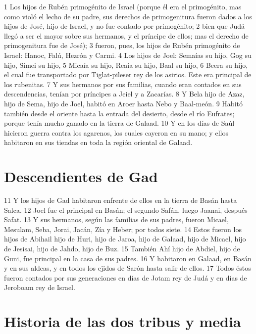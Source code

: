 1 Los hijos de Rubén primogénito de Israel (porque él era el primogénito, mas como violó el lecho de su padre, sus derechos de primogenitura fueron dados a los hijos de José, hijo de Israel, y no fue contado por primogénito;
2 bien que Judá llegó a ser el mayor sobre sus hermanos, y el príncipe de ellos; mas el derecho de primogenitura fue de José);
3 fueron, pues, los hijos de Rubén primogénito de Israel: Hanoc, Falú, Hezrón y Carmi.
4 Los hijos de Joel: Semaías su hijo, Gog su hijo, Simei su hijo,
5 Micaía su hijo, Reaía su hijo, Baal su hijo,
6 Beera su hijo, el cual fue transportado por Tiglat-pileser rey de los asirios. Este era principal de los rubenitas.
7 Y sus hermanos por sus familias, cuando eran contados en sus descendencias, tenían por príncipes a Jeiel y a Zacarías.
8 Y Bela hijo de Azaz, hijo de Sema, hijo de Joel, habitó en Aroer hasta Nebo y Baal-meón.
9 Habitó también desde el oriente hasta la entrada del desierto, desde el río Eufrates; porque tenía mucho ganado en la tierra de Galaad.
10 Y en los días de Saúl hicieron guerra contra los agarenos, los cuales cayeron en su mano; y ellos habitaron en sus tiendas en toda la región oriental de Galaad.

\section*{Descendientes de Gad}

11 Y los hijos de Gad habitaron enfrente de ellos en la tierra de Basán hasta Salca.
12 Joel fue el principal en Basán; el segundo Safán, luego Jaanai, después Safat.
13 Y sus hermanos, según las familias de sus padres, fueron Micael, Mesulam, Seba, Jorai, Jacán, Zía y Heber; por todos siete.
14 Estos fueron los hijos de Abihail hijo de Huri, hijo de Jaroa, hijo de Galaad, hijo de Micael, hijo de Jesisai, hijo de Jahdo, hijo de Buz.
15 También Ahí hijo de Abdiel, hijo de Guni, fue principal en la casa de sus padres.
16 Y habitaron en Galaad, en Basán y en sus aldeas, y en todos los ejidos de Sarón hasta salir de ellos.
17 Todos éstos fueron contados por sus generaciones en días de Jotam rey de Judá y en días de Jeroboam rey de Israel.

\section*{Historia de las dos tribus y media}

